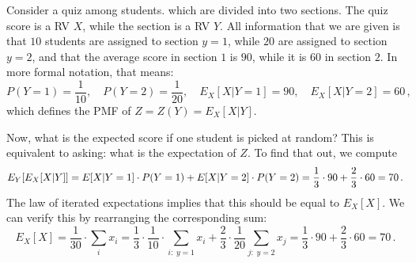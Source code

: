 \begin{ex}
Consider a quiz among students. which are divided into two sections. The quiz score is a RV $X$, while the section is a RV $Y$. All information that we are given is that $10$ students are assigned to section $y = 1$, while $20$ are assigned to section $y = 2$, and that the average score in section $1$ is $90$, while it is $60$ in section $2$. In more formal notation, that means:
\begin{equation*}
P(Y = 1) = \frac{1}{10}, \quad P(Y = 2) = \frac{1}{20}, \quad E_X[X | Y = 1] = 90, \quad E_X[X | Y = 2] = 60 \, ,
\end{equation*}
which defines the PMF of $Z = Z(Y) = E_X[X | Y]$.


Now, what is the expected score if one student is picked at random? This is equivalent to asking: what is the expectation of $Z$. To find that out, we compute
\begin{equation*}
E_Y\qty[E_X[X | Y]] = E[X | Y = 1] \cdot P(Y = 1) + E[X | Y = 2] \cdot P(Y = 2) = \frac{1}{3} \cdot 90 + \frac{2}{3} \cdot 60 = 70 \, .
\end{equation*}
The law of iterated expectations implies that this should be equal to $E_X[X]$. We can verify this by rearranging the corresponding sum:
\begin{equation*}
E_X[X] = \frac{1}{30} \cdot \sum_i x_i = \frac{1}{3} \cdot \frac{1}{10} \cdot \sum_{i: \; y = 1} x_i + \frac{2}{3} \cdot \frac{1}{20} \sum_{j: \; y = 2} x_j = \frac{1}{3} \cdot 90 + \frac{2}{3} \cdot 60 = 70 \, .
\end{equation*}


\end{ex}
